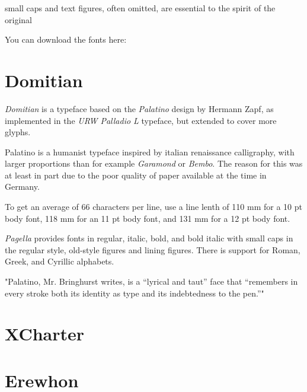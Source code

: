 small caps and text figures,
often omitted, are essential to the spirit of the original

You can download the fonts here:  

%
%

\switchtobodyfont[domitian,10pt]
\chapter[domitian]{Domitian}

{\it Domitian} is a typeface based on the {\it Palatino} design by Hermann Zapf, as implemented in the {\it URW Palladio L} typeface, but extended to cover more glyphs.

Palatino is a humanist typeface inspired by italian renaissance calligraphy, with larger proportions than for example {\it Garamond} or {\it Bembo}. The reason for this was at least in part due to the poor quality of paper available at the time in Germany.

To get an average of 66 characters per line, use a line lenth of 110 mm for a 10 pt body font, 118 mm for an 11 pt body font, and 131 mm for a 12 pt body font.

{\it Pagella} provides fonts in regular, italic, bold, and bold italic with small caps in the regular style, old-style figures and lining figures. There is support for Roman, Greek, and Cyrillic alphabets.

"Palatino, Mr. Bringhurst writes, is a “lyrical and taut” face that “remembers in every stroke both its identity as type and its indebtedness to the pen.”"

%
%

\switchtobodyfont[xcharter,10pt]
\chapter[xcharter]{XCharter}



%
%

\switchtobodyfont[erewhon,10pt]
\chapter[erewhon]{Erewhon}



